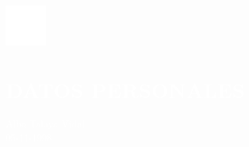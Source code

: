 \documentclass[../main.tex]{subfiles}
\begin{document}
    \hspace*{0.2cm}
    \begin{minipage}[t]{2cm}
        \vspace*{-0.3cm}\includegraphics[width=1.5cm]{../assets/person.png}
    \end{minipage}
    \begin{minipage}[t]{5cm}
    
        \section*{\textcolor{white}{DATOS PERSONALES}}
        \vspace*{-0.25cm}
        \textcolor{white}{
            Alba Talaya Vidal \\
            05-11-1998
        }
    \end{minipage}
\end{document}
